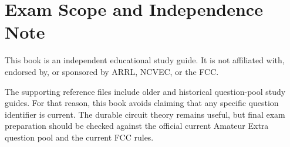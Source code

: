 \chapter*{Exam Scope and Independence Note}
This book is an independent educational study guide. It is not affiliated with,
endorsed by, or sponsored by ARRL, NCVEC, or the FCC.

The supporting reference files include older and historical question-pool study
guides. For that reason, this book avoids claiming that any specific question
identifier is current. The durable circuit theory remains useful, but final exam
preparation should be checked against the official current Amateur Extra
question pool and the current FCC rules.
